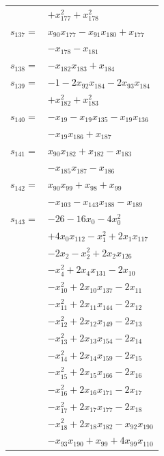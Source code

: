 \begin{longtable}{@{}r@{\;}l@{}}
 & \(\displaystyle +x_{177}^{2} +x_{178}^{2}\) \\[3pt]
\(s_{137}=\) & \(\displaystyle x_{90}x_{177} -x_{91}x_{180} +x_{177}\) \\
 & \(\displaystyle -x_{178} -x_{181}\) \\[3pt]
\(s_{138}=\) & \(\displaystyle -x_{182}x_{183} +x_{184}\) \\[3pt]
\(s_{139}=\) & \(\displaystyle -1 -2x_{92}x_{184} -2x_{93}x_{184}\) \\
 & \(\displaystyle +x_{182}^{2} +x_{183}^{2}\) \\[3pt]
\(s_{140}=\) & \(\displaystyle -x_{19} -x_{19}x_{135} -x_{19}x_{136}\) \\
 & \(\displaystyle -x_{19}x_{186} +x_{187}\) \\[3pt]
\(s_{141}=\) & \(\displaystyle x_{90}x_{182} +x_{182} -x_{183}\) \\
 & \(\displaystyle -x_{185}x_{187} -x_{186}\) \\[3pt]
\(s_{142}=\) & \(\displaystyle x_{90}x_{99} +x_{98} +x_{99}\) \\
 & \(\displaystyle -x_{103} -x_{143}x_{188} -x_{189}\) \\[3pt]
\(s_{143}=\) & \(\displaystyle -26 -16x_{0} -4x_{0}^{2}\) \\
 & \(\displaystyle +4x_{0}x_{112} -x_{1}^{2} +2x_{1}x_{117}\) \\
 & \(\displaystyle -2x_{2} -x_{2}^{2} +2x_{2}x_{126}\) \\
 & \(\displaystyle -x_{4}^{2} +2x_{4}x_{131} -2x_{10}\) \\
 & \(\displaystyle -x_{10}^{2} +2x_{10}x_{137} -2x_{11}\) \\
 & \(\displaystyle -x_{11}^{2} +2x_{11}x_{144} -2x_{12}\) \\
 & \(\displaystyle -x_{12}^{2} +2x_{12}x_{149} -2x_{13}\) \\
 & \(\displaystyle -x_{13}^{2} +2x_{13}x_{154} -2x_{14}\) \\
 & \(\displaystyle -x_{14}^{2} +2x_{14}x_{159} -2x_{15}\) \\
 & \(\displaystyle -x_{15}^{2} +2x_{15}x_{166} -2x_{16}\) \\
 & \(\displaystyle -x_{16}^{2} +2x_{16}x_{171} -2x_{17}\) \\
 & \(\displaystyle -x_{17}^{2} +2x_{17}x_{177} -2x_{18}\) \\
 & \(\displaystyle -x_{18}^{2} +2x_{18}x_{182} -x_{92}x_{190}\) \\
 & \(\displaystyle -x_{93}x_{190} +x_{99} +4x_{99}x_{110}\) \\

\end{longtable}
